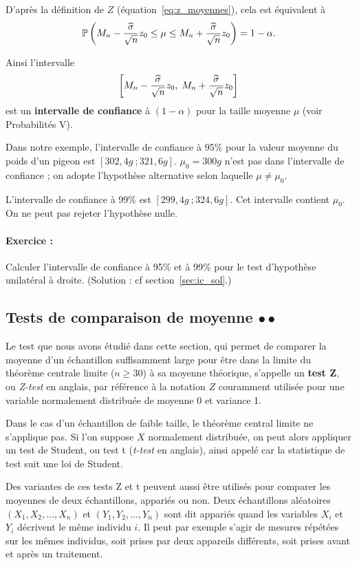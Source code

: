 D'après la définition de $Z$ (équation~\eqref{eq:z_moyennes}), cela est équivalent à 
\[
\mathbb{P}\left( M_n - \frac{{\widehat \sigma}}{\sqrt{n}} z_0 \leq 
\mu \leq M_n + \frac{{\widehat \sigma}}{\sqrt{n}}z_0 \right) = 1 - \alpha.
\]

Ainsi l'intervalle 
\[
\left[ M_n - \frac{{\widehat \sigma}}{\sqrt{n}} z_0, \; M_n +
\frac{{\widehat \sigma}}{\sqrt{n}} z_0 \right]
\]
est un \textbf{intervalle de confiance} à $(1 - \alpha)$ pour la taille moyenne
$\mu$ (voir Probabilités V).

Dans notre exemple, l'intervalle de confiance à 95\% pour la valeur moyenne du
poids d'un pigeon est $[302,4\si{g}~; 321,6\si{g}]$.
$\mu_0 = 300\si{g}$ n'est pas dans l'intervalle de confiance ; on adopte l'hypothèse
alternative selon laquelle $\mu \neq \mu_0.$

L'intervalle de confiance à 99\% est $[299,4\si{g}~; 324,6\si{g}].$ Cet
intervalle contient $\mu_0$. On ne peut pas rejeter l'hypothèse nulle.

\paragraph{Exercice :} Calculer l'intervalle de confiance à 95\% et à 99\% pour
le test d'hypothèse unilatéral à droite. (Solution : cf section~\ref{sec:ic_sol}.)

\subsection{Tests de comparaison de moyenne $\bullet \bullet$} 
Le test que nous avons étudié dans cette section, qui permet de comparer la
moyenne d'un échantillon suffisamment large pour être dans la limite du
théorème centrale limite ($n \geq 30$) à sa moyenne théorique, s'appelle un
\textbf{test Z}, ou \textit{Z-test} en anglais, par référence à la notation $Z$
couramment utilisée pour une variable normalement distribuée de moyenne 0 et
variance 1.

Dans le cas d'un échantillon de faible taille, le théorème central limite ne
s'applique pas. Si l'on suppose $X$ normalement distribuée, on peut alors
appliquer un test de Student, ou test t (\textit{t-test} en anglais), ainsi
appelé car la statistique de test suit une loi de Student.

Des variantes de ces tests Z et t peuvent aussi être utilisés pour comparer les
moyennes de deux échantillons, appariés ou non. Deux échantillons aléatoires
$(X_1, X_2, \dots, X_n)$ et $(Y_1, Y_2, \dots, Y_n)$ sont dit appariés quand
les variables $X_i$ et $Y_i$ décrivent le même individu $i$. Il peut par
exemple s'agir de mesures répétées sur les mêmes individus, soit prises par
deux appareils différents, soit prises avant et après un traitement.



